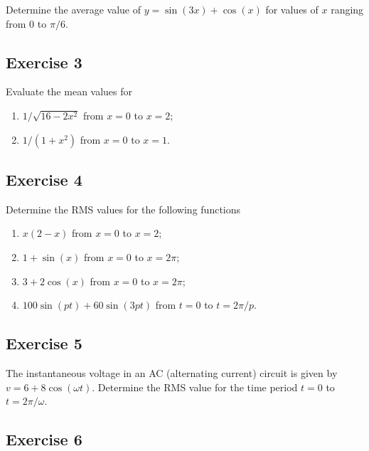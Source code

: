 \documentclass[
  english,
  11pt,
  oneside]{book}
\providecommand{\tightlist}{%
  \setlength{\itemsep}{0pt}\setlength{\parskip}{0pt}}
\newcommand{\slide}{}
\theoremstyle{definition}
\theoremstyle{definition}
\theoremstyle{definition}
\theoremstyle{definition}
\theoremstyle{remark}
\begin{document}
Determine the average value of \(y = \sin(3x) + \cos(x)\) for values of \(x\) ranging from \(0\) to \(\pi/6\).

\slide

\subsection*{Exercise 3}\label{exercise-3-7}

Evaluate the mean values for

\begin{enumerate}
\def\labelenumi{\roman{enumi}.}
\tightlist
\item
  \(1/\sqrt{16-2x^2}\) from \(x=0\) to \(x=2\);
\item
  \(1/(1+x^2)\) from \(x=0\) to \(x=1\).
\end{enumerate}

\slide

\subsection*{Exercise 4}\label{exercise-4-5}

Determine the RMS values for the following functions

\begin{enumerate}
\def\labelenumi{\roman{enumi}.}
\tightlist
\item
  \(x(2-x)\) from \(x=0\) to \(x=2\);
\item
  \(1+\sin(x)\) from \(x=0\) to \(x=2\pi\);
\item
  \(3+2\cos(x)\) from \(x=0\) to \(x=2\pi\);
\item
  \(100\sin(pt)+60\sin(3pt)\) from \(t=0\) to \(t=2\pi/p\).
\end{enumerate}

\slide

\subsection*{Exercise 5}\label{exercise-5-4}

The instantaneous voltage in an AC (alternating current) circuit is given by \(v = 6 + 8\cos(\omega t)\).
Determine the RMS value for the time period \(t = 0\) to \(t = 2\pi/\omega\).

\slide

\subsection*{Exercise 6}\label{exercise-6-4}
\end{document}
